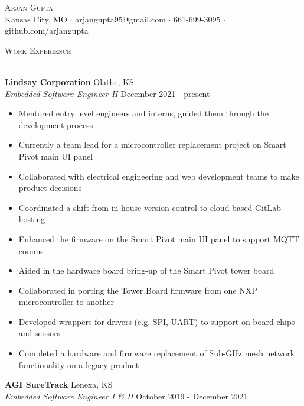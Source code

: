 \documentclass[a4paper]{article}
\newcommand{\lineunder} {
    \vspace*{-8pt} \\
    \hspace*{-18pt} \hrulefill \\
}
\newcommand{\header} [1] {
    {\hspace*{-18pt}\vspace*{6pt} \textsc{#1}}
    \vspace*{-6pt} \lineunder
}
\begin{document}
\vspace*{-40pt}

    

\vspace*{-10pt}
\begin{center}
	{\Huge \scshape {Arjan Gupta}}\\
	Kansas City, MO $\cdot$ arjangupta95@gmail.com $\cdot$ 661-699-3095 $\cdot$ github.com/arjangupta\\
\end{center}

\header{Work Experience}
\vspace{1mm}

\textbf{Lindsay Corporation} \hfill Olathe, KS\\
\textit{Embedded Software Engineer II} \hfill December 2021 - present\\
\vspace{-1mm}
\begin{itemize} \itemsep 1pt
    \item Mentored entry level engineers and interns, guided them through the development process
    \item Currently a team lead for a microcontroller replacement project on Smart Pivot main UI panel
    \item Collaborated with electrical engineering and web development teams to make product decisions
    \item Coordinated a shift from in-house version control to cloud-based GitLab hosting
    \item Enhanced the firmware on the Smart Pivot main UI panel to support MQTT comms
    \item Aided in the hardware board bring-up of the Smart Pivot tower board
    \item Collaborated in porting the Tower Board firmware from one NXP microcontroller to another
    \item Developed wrappers for drivers (e.g. SPI, UART) to support on-board chips and sensors
    \item Completed a hardware and firmware replacement of Sub-GHz mesh network functionality on a legacy product
\end{itemize}
\textbf{AGI SureTrack} \hfill Lenexa, KS\\
\textit{Embedded Software Engineer I \& II} \hfill October 2019 - December 2021\\
\vspace{-1mm}
\end{document}
